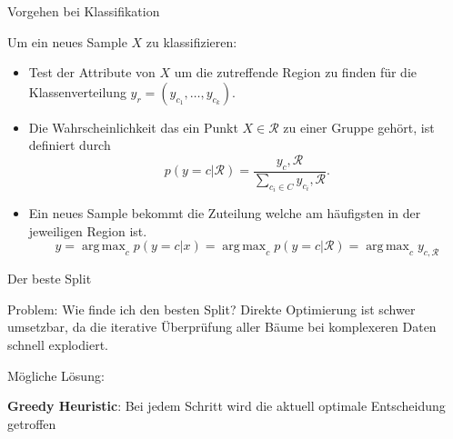 \documentclass{beamer}
\DeclareMathOperator*{\argmax}{arg\,max}
\begin{document}
\begin{frame}{Vorgehen bei Klassifikation}

Um ein neues Sample $X$ zu klassifizieren:
	\begin{itemize}
		\item Test der Attribute von $X$ um die zutreffende Region zu finden für die Klassenverteilung $y_r = (y_{c_1}, \ldots, y_{c_k})$.
		\item Die Wahrscheinlichkeit das ein Punkt $X \in \mathcal{R}$ zu einer Gruppe gehört, ist definiert durch
			\[p(y = c | \mathcal{R}) = \frac{y_c, \mathcal{R}}{\sum_{c_i \in C} y_{c_i}, \mathcal{R}}.\]
		\item Ein neues Sample bekommt die Zuteilung welche am häufigsten in der jeweiligen Region ist.
			\[\hat{y} = \argmax_c p(y = c | x) = \argmax_c p(y = c | \mathcal{R}) = \argmax_c y_{c,\mathcal{R}}\]
	\end{itemize}
\end{frame}


\begin{frame}{Der beste Split}
\begin{alertblock}{Problem: Wie finde ich den besten Split?}
	Direkte Optimierung ist schwer umsetzbar, da die iterative Überprüfung aller Bäume bei komplexeren Daten schnell explodiert.
	\\\vspace{0.5cm}
	
	
	Mögliche Lösung:\\ \vspace{0.5cm}
	
	
	\textbf{Greedy Heuristic}: Bei jedem Schritt wird die aktuell optimale Entscheidung getroffen

\end{alertblock}

\end{frame}
\end{document}
